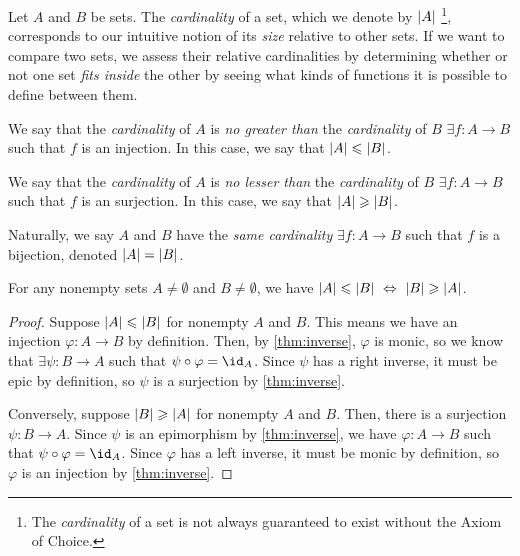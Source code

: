\begin{definition}[Cardinality]
    Let $A$ and $B$ be sets.
    The \emph{cardinality} of a set,
    which we denote by $\lvert A\rvert$%
    \footnote{The \emph{cardinality} of a set is not always guaranteed to exist without the Axiom of Choice.},
    corresponds to our intuitive notion of its \emph{size} relative to other sets.
    If we want to compare two sets,
    we assess their relative cardinalities by determining whether or not one set \emph{fits inside} the other
    by seeing what kinds of functions it is possible to define between them.

    We say that the \emph{cardinality} of $A$ is \emph{no greater than} the \emph{cardinality} of $B$
    \iffbydefn $\exists f: A \to B$ such that $f$ is an injection.
    In this case, we say that $\lvert A\rvert \leqslant \lvert B\rvert$.

    We say that the \emph{cardinality} of $A$ is \emph{no lesser than} the \emph{cardinality} of $B$
    \iffbydefn $\exists f: A \to B$ such that $f$ is an surjection.
    In this case, we say that $\lvert A\rvert \geqslant \lvert B\rvert$.

    Naturally, we say $A$ and $B$ have the \emph{same cardinality}
    \iffbydefn $\exists f: A \to B$ such that $f$ is a bijection,
    denoted $\lvert A\rvert = \lvert B\rvert$.
\end{definition}

\begin{corollary}
    For any nonempty sets $A \neq \emptyset$ and $B \neq \emptyset$, we have
    $\lvert A\rvert \leqslant \lvert B\rvert ~\Leftrightarrow~ \lvert B\rvert \geqslant \lvert A\rvert$.
\end{corollary}
\begin{proof}
    Suppose $\lvert A\rvert \leqslant \lvert B\rvert$ for nonempty $A$ and $B$.
    This means we have an injection $\varphi: A \to B$ by definition.
    Then, by \autoref{thm:inverse}, $\varphi$ is monic,
    so we know that $\exists \psi: B \to A$ such that $\psi \compose \varphi = \id_A$.
    Since $\psi$ has a right inverse, it must be epic by definition,
    so $\psi$ is a surjection by \autoref{thm:inverse}.

    Conversely, suppose $\lvert B\rvert \geqslant \lvert A\rvert$ for nonempty $A$ and $B$.
    Then, there is a surjection $\psi: B \to A$.
    Since $\psi$ is an epimorphism by \autoref{thm:inverse},
    we have $\varphi: A \to B$ such that $\psi \compose \varphi = \id_A$.
    Since $\varphi$ has a left inverse, it must be monic by definition,
    so $\varphi$ is an injection by \autoref{thm:inverse}.
\end{proof}

